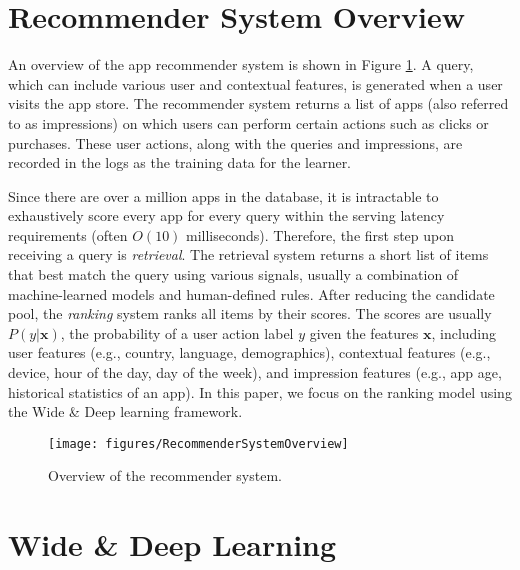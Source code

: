 \documentclass{sig-alternate-05-2015}
\begin{document}
\section{Recommender System Overview}

An overview of the app recommender system is shown in Figure \ref{fig:RecommenderSystemOverview}. A query, which can include various user and contextual features, is generated when a user visits the app store. The recommender system returns a list of apps (also referred to as impressions) on which users can perform certain actions such as clicks or purchases. These user actions, along with the queries and impressions, are recorded in the logs as the training data for the learner.

Since there are over a million apps in the database, it is intractable to exhaustively score every app for every query within the serving latency requirements (often $O(10)$ milliseconds). Therefore, the first step upon receiving a query is \textit{retrieval}. The retrieval system returns a short list of items that best match the query using various signals, usually a combination of machine-learned models and human-defined rules. After reducing the candidate pool, the \textit{ranking} system ranks all items by their scores. The scores are usually $P(y|\mathbf{x})$, the probability of a user action label $y$ given the features $\mathbf{x}$, including user features (e.g., country, language, demographics), contextual features (e.g., device, hour of the day, day of the week), and impression features (e.g., app age, historical statistics of an app). In this paper, we focus on the ranking model using the Wide \& Deep learning framework.

\begin{figure}[t!]
	\centering
	\texttt{[image: figures/RecommenderSystemOverview]}
	\caption{Overview of the recommender system.}
	\label{fig:RecommenderSystemOverview}
\end{figure}

\section{Wide \& Deep Learning}
\end{document}
